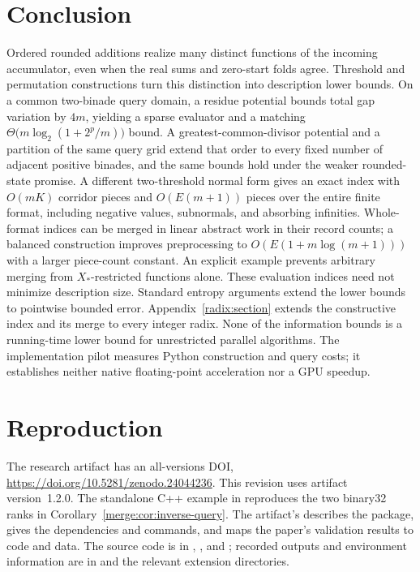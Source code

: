 \documentclass[11pt,reqno]{amsart}
\theoremstyle{definition}
\theoremstyle{remark}
\numberwithin{equation}{section}
\begin{document}
\section{Conclusion}\label{sec:conclusion}

Ordered rounded additions realize many distinct functions of the incoming
accumulator, even when the real sums and zero-start folds agree. Threshold
and permutation constructions turn this distinction into description lower
bounds. On a common two-binade query domain, a residue potential bounds total
gap variation by $4m$, yielding a sparse evaluator and a matching
$\Theta\bigl(m\log_2(1+2^p/m)\bigr)$ bound. A greatest-common-divisor
potential and a partition of the same query grid extend that order to every
fixed number of adjacent positive binades, and the same bounds hold under
the weaker rounded-state promise. A different two-threshold normal form
gives an exact index with $O(mK)$ corridor pieces and $O(E(m+1))$ pieces
over the entire finite format, including negative values, subnormals,
and absorbing infinities. Whole-format indices can be merged in linear
abstract work in their record counts; a balanced construction improves
preprocessing to $O(E(1+m\log(m+1)))$ with a larger piece-count constant.
An explicit example prevents arbitrary merging from $X_\ast$-restricted
functions alone. These evaluation indices need not minimize description size. Standard entropy arguments extend the lower bounds to
pointwise bounded error. Appendix~\ref{radix:section} extends the constructive
index and its merge to every integer radix. None of the information bounds
is a running-time lower bound for unrestricted parallel algorithms.
The implementation pilot measures Python construction and query costs;
it establishes neither native floating-point acceleration nor a GPU speedup.

\appendix


\section{Reproduction}\label{sec:artifact}

The research artifact has an all-versions DOI,
\url{https://doi.org/10.5281/zenodo.24044236}. This revision uses
artifact version~1.2.0. The standalone C++ example in
 reproduces the two binary32
ranks in Corollary~\ref{merge:cor:inverse-query}. The artifact's 
describes the package,  gives the dependencies and
commands, and  maps the paper's validation results
to code and data. The source code is in ,
, and ; recorded
outputs and environment information are in  and
the relevant extension directories.
\end{document}

